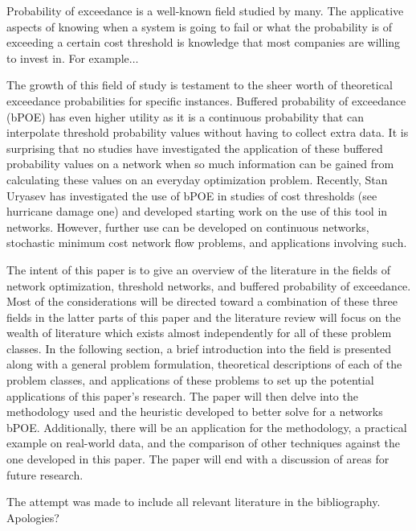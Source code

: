 Probability of exceedance is a well-known field studied by many. The applicative aspects of knowing when a system is going to fail or what the probability is of exceeding a certain cost threshold is knowledge that most companies are willing to invest in. For example$\dots$\par
The growth of this field of study is testament to the sheer worth of theoretical exceedance probabilities for specific instances. Buffered probability of exceedance (bPOE) has even higher utility as it is a continuous probability that can interpolate threshold probability values without having to collect extra data. It is surprising that no studies have investigated the application of these buffered probability values on a network when so much information can be gained from calculating these values on an everyday optimization problem. Recently, Stan Uryasev has investigated the use of bPOE in studies of cost thresholds (see hurricane damage one) and developed starting work on the use of this tool in networks. However, further use can be developed on continuous networks, stochastic minimum cost network flow problems, and applications involving such.\par
The intent of this paper is to give an overview of the literature in the fields of network optimization, threshold networks, and buffered probability of exceedance. Most of the considerations will be directed toward a combination of these three fields in the latter parts of this paper and the literature review will focus on the wealth of literature which exists almost independently for all of these problem classes. In the following section, a brief introduction into the field is presented along with a general problem formulation, theoretical descriptions of each of the problem classes, and applications of these problems to set up the potential applications of this paper’s research. The paper will then delve into the methodology used and the heuristic developed to better solve for a networks bPOE. Additionally, there will be an application for the methodology, a practical example on real-world data, and the comparison of other techniques against the one developed in this paper. The paper will end with a discussion of areas for future research.\par
The attempt was made to include all relevant literature in the bibliography. Apologies?
